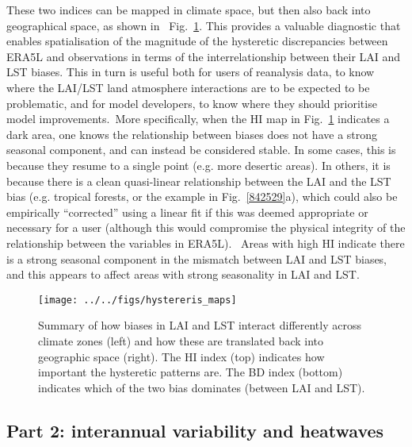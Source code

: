 \documentclass[gmd, manuscript]{copernicus}
\begin{document}
{{These two indices can be mapped in climate space, but then also back
into geographical space, as shown in~
Fig.~}{\ref{988186}}{.} This provides a valuable
diagnostic that enables spatialisation of the magnitude of the
hysteretic discrepancies between ERA5L and observations in terms of the
interrelationship between their LAI and LST biases. This in turn is
useful both for users of reanalysis data, to know where the LAI/LST land
atmosphere interactions are to be expected to be problematic, and for
model developers, to know where they should prioritise model
improvements.~{{More specifically, when the HI map in
Fig.~}}{\ref{988186}}{ indicates a dark area, one knows
the relationship between biases does not have a strong seasonal
component}, and can instead be considered stable. In some cases, this is
because they resume to a single point (e.g. more desertic areas). In
others, it is because there is a clean quasi-linear relationship between
the LAI and the LST bias (e.g. tropical forests, or the example in
Fig.~{\ref{842529}}a), which could also be empirically
``corrected'' using a linear fit if this was deemed appropriate or
necessary for a user (although this would compromise the physical
integrity of the relationship between the variables in ERA5L).~ Areas
with high HI indicate there is a strong seasonal component in the
mismatch between LAI and LST biases, and this appears to affect areas
with strong seasonality in LAI and LST.

\par\null{}
\begin{figure}[H]
\begin{center}
\texttt{[image: ../../figs/hystereris\_maps]}
\caption{{{Summary of how biases in LAI and LST interact} differently across
climate zones (left) and how these are translated back into geographic
space (right). {The HI index (top) indicates how important the
hysteretic patterns are. The BD index (bottom) indicates which of the
two bias dominates (between LAI and LST).}~
{\label{988186}}%
}}
\end{center}
\end{figure}

\par\null\par\null

\subsection*{Part 2: interannual variability and
heatwaves}

}
\end{document}
